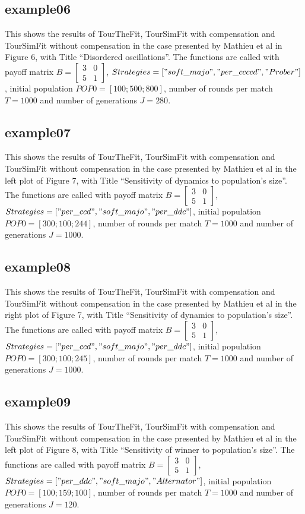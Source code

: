 \subsection{example06}
This shows the results of TourTheFit, TourSimFit with compensation and TourSimFit without compensation in the case presented by Mathieu et al in Figure 6, with Title ``Disordered oscillations''. The functions are called with payoff matrix $B = \begin{bmatrix} 3 & 0 \\ 5 & 1 \end{bmatrix}$, $Strategies = ["soft\_majo", "per\_ccccd", "Prober"]$, initial population $POP0 = [100; 500; 800]$, number of rounds per match $T = 1000$ and number of generations $J = 280$.

\subsection{example07}
This shows the results of TourTheFit, TourSimFit with compensation and TourSimFit without compensation in the case presented by Mathieu et al in the left plot of Figure 7, with Title ``Sensitivity of dynamics to population's size''. The functions are called with payoff matrix $B = \begin{bmatrix} 3 & 0 \\ 5 & 1 \end{bmatrix}$, $Strategies = ["per\_ccd", "soft\_majo", "per\_ddc"]$, initial population $POP0 = [300; 100; 244]$, number of rounds per match $T = 1000$ and number of generations $J = 1000$.

\subsection{example08}
This shows the results of TourTheFit, TourSimFit with compensation and TourSimFit without compensation in the case presented by Mathieu et al in the right plot of Figure 7, with Title ``Sensitivity of dynamics to population's size''. The functions are called with payoff matrix $B = \begin{bmatrix} 3 & 0 \\ 5 & 1 \end{bmatrix}$, $Strategies = ["per\_ccd", "soft\_majo", "per\_ddc"]$, initial population $POP0 = [300; 100; 245]$, number of rounds per match $T = 1000$ and number of generations $J = 1000$.

\subsection{example09}
This shows the results of TourTheFit, TourSimFit with compensation and TourSimFit without compensation in the case presented by Mathieu et al in the left plot of Figure 8, with Title ``Sensitivity of winner to population's size''. The functions are called with payoff matrix $B = \begin{bmatrix} 3 & 0 \\ 5 & 1 \end{bmatrix}$, $Strategies = ["per\_ddc", \- "soft\_majo", \-"Alternator"]$, initial population $POP0 = [100; 159; 100]$, number of rounds per match $T = 1000$ and number of generations $J = 120$.

